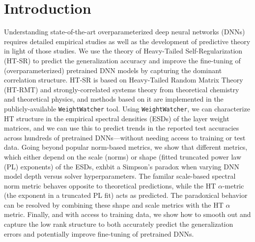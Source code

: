 \documentclass{article}
\begin{document}


\section*{Introduction}

Understanding state-of-the-art overparameterized deep neural networks (DNNs) requires detailed empirical studies as well as the development of predictive theory in light of those studies. 
We use the theory of Heavy-Tailed Self-Regularization (HT-SR) to predict the generalization accuracy and improve the fine-tuning of (overparameterized) pretrained DNN models by capturing the dominant correlation structure.
HT-SR is based on Heavy-Tailed Random Matrix Theory (HT-RMT) and strongly-correlated systems theory from theoretical chemistry and theoretical physics, and methods based on it are implemented in the publicly-available \texttt{WeightWatcher} tool.
Using \texttt{WeightWatcher}, we can characterize HT structure in the empirical spectral densities (ESDs) of the layer weight matrices, and we can use this to predict trends in the reported test accuracies across hundreds of pretrained DNNs---without needing access to training or test data.
Going beyond popular norm-based metrics, we show that different metrics, which either depend on the scale (norms) or shape (fitted truncated power law (PL) exponents) of the ESDs, exhbit a Simpson's paradox when varying DNN model depth versus solver hyperparameters.
The familar scale-based spectral norm metric behaves opposite to theoretical predictions, while the HT $\alpha$-metric (the exponent in a truncated PL fit) acts as predicted.
The paradoxical behavior  can be resolved by combining these shape and scale metrics with the HT $\hat{\alpha}$ metric.
Finally, and with access to training data, we show how to
smooth out and capture the low rank structure to both accurately
predict the generalization errors and potentially improve
fine-tuning of pretrained DNNs.
\end{document}
